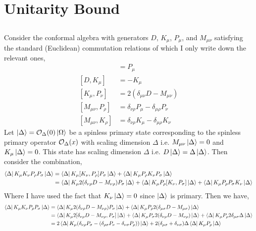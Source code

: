 \documentclass[12pt]{article}
\begin{document}

\section{Unitarity Bound}

\subsection{}

Consider the conformal algebra with generators $D$, $K_\mu$, $P_\mu$, and $M_{\mu \nu}$ satisfying the standard (Euclidean) commutation relations of which I only write down the relevant ones,
\begin{align*}
[ D, P_\mu] & = P_\mu 
\\
[ D, K_\mu] & = - K_\mu
\\
[ K_\mu, P_\nu] & = 2 \left( \delta_{\mu \nu} D -  M_{\mu \nu} \right)
\\
[M_{\mu \nu}, P_\rho] & =  
\delta_{\nu \rho} P_\mu  - \delta_{\mu \rho} P_\nu 
\\
[M_{\mu \nu}, K_{\rho}] & =  \delta_{\nu \rho} K_\mu  - \delta_{\mu \rho} K_\nu  
\end{align*}
Let $\left| \Delta \right> = \mathcal{O}_\Delta(0) \left| \Omega \right>$ be a spinless primary state corresponding to the spinless primary operator $\mathcal{O}_\Delta(x)$ with scaling dimension $\Delta$ i.e. $M_{\mu \nu} \left| \Delta \right> = 0$ and $K_\mu \left| \Delta \right> = 0$. This state has scaling dimension $\Delta$ i.e. $D \left| \Delta \right> = \Delta \left| \Delta \right>$. Then consider the combination,
\begin{align*}
\left< \Delta \right| K_\mu K_{\nu} P_{\rho} P_{\sigma} \left| \Delta \right> & = \left< \Delta \right| K_\mu [ K_{\nu}, P_{\rho}] P_{\sigma} \left| \Delta \right> + \left< \Delta \right| K_\mu  P_{\rho} K_{\nu} P_{\sigma} \left| \Delta \right>
\\
& = \left< \Delta \right| K_\mu 2 (\delta_{\nu \rho} D - M_{\nu \rho}) P_{\sigma} \left| \Delta \right> + \left< \Delta \right| K_\mu  P_{\rho} [K_{\nu}, P_{\sigma}]\left| \Delta \right> + \left< \Delta \right| K_\mu  P_{\rho}  P_{\sigma}  K_{\nu}\left| \Delta \right>
\end{align*}
Where I have used the fact that $K_\nu \left| \Delta \right> = 0$ since $\left| \Delta \right>$ is primary.
Then we have,
\begin{align*}
\left< \Delta \right| K_\mu K_{\nu} P_{\rho} P_{\sigma} \left| \Delta \right> 
& = \left< \Delta \right| K_\mu 2 (\delta_{\nu \rho} D - M_{\nu \rho}) P_{\sigma} \left| \Delta \right> + \left< \Delta \right| K_\mu  P_{\rho} 2 (\delta_{\mu \sigma} D - M_{\mu \sigma} ) \left| \Delta \right> 
\\
& = \left< \Delta \right| K_\mu 2 [\delta_{\nu \rho} D - M_{\nu \rho}, P_{\sigma}] \left| \Delta \right> + \left< \Delta \right| K_\mu P_{\sigma} 2 (\delta_{\nu \rho} D - M_{\nu \rho})  \left| \Delta \right> + \left< \Delta \right| K_\mu  P_{\rho} 2 \delta_{\mu \sigma} \Delta \left| \Delta \right> 
\\
& = 2 \left< \Delta \right| K_\mu (\delta_{\nu \rho} P_\sigma - (\delta_{\rho \sigma} P_\nu - \delta_{\nu \sigma} P_\rho))  \left| \Delta \right>  + 2 (\delta_{\mu \sigma} + \delta_{\nu \sigma}) \Delta \left< \Delta \right| K_\mu  P_{\rho}  \left| \Delta \right> 
\end{align*}
\end{document}
